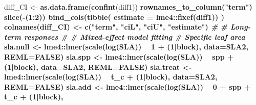 \documentclass[]{scrartcl}
\newenvironment{Shaded}{\begin{snugshade}}{\end{snugshade}}
\newcommand{\CommentTok}[1]{\textcolor[rgb]{0.56,0.35,0.01}{\textit{#1}}}
\newcommand{\DataTypeTok}[1]{\textcolor[rgb]{0.13,0.29,0.53}{#1}}
\newcommand{\DecValTok}[1]{\textcolor[rgb]{0.00,0.00,0.81}{#1}}
\newcommand{\KeywordTok}[1]{\textcolor[rgb]{0.13,0.29,0.53}{\textbf{#1}}}
\newcommand{\NormalTok}[1]{#1}
\newcommand{\OperatorTok}[1]{\textcolor[rgb]{0.81,0.36,0.00}{\textbf{#1}}}
\newcommand{\OtherTok}[1]{\textcolor[rgb]{0.56,0.35,0.01}{#1}}
\newcommand{\StringTok}[1]{\textcolor[rgb]{0.31,0.60,0.02}{#1}}
\begin{document}
\begin{Shaded}
\begin{Highlighting}[]
{{{{{{{{{\NormalTok{    diff_CI <-}\StringTok{ }\KeywordTok{as.data.frame}\NormalTok{(}\KeywordTok{confint}\NormalTok{(diff1)) }\OperatorTok{%
\StringTok{                }\KeywordTok{rownames_to_column}\NormalTok{(}\StringTok{"term"}\NormalTok{) }\OperatorTok{%
\StringTok{                }\KeywordTok{slice}\NormalTok{(}\OperatorTok{-}\NormalTok{(}\DecValTok{1}\OperatorTok{:}\DecValTok{2}\NormalTok{)) }\OperatorTok{%
\StringTok{                }\KeywordTok{bind_cols}\NormalTok{(}\KeywordTok{tibble}\NormalTok{(}
                  \DataTypeTok{estimate =}\NormalTok{ lme4}\OperatorTok{::}\KeywordTok{fixef}\NormalTok{(diff1)) )}
    \KeywordTok{colnames}\NormalTok{(diff_CI) <-}\StringTok{ }\KeywordTok{c}\NormalTok{(}\StringTok{"term"}\NormalTok{, }\StringTok{"ciL"}\NormalTok{, }\StringTok{"ciU"}\NormalTok{, }\StringTok{"estimate"}\NormalTok{)}
\CommentTok{#}
\CommentTok{#  Long-term responses}
\CommentTok{#}
\CommentTok{# Mixed-effect model fitting}
  \CommentTok{# Specific leaf area}
\NormalTok{    sla.null <-}\StringTok{ }\NormalTok{lme4}\OperatorTok{::}\KeywordTok{lmer}\NormalTok{(}\KeywordTok{scale}\NormalTok{(}\KeywordTok{log}\NormalTok{(SLA)) }\OperatorTok{~}\StringTok{ }\DecValTok{1} \OperatorTok{+}\StringTok{ }\NormalTok{(}\DecValTok{1}\OperatorTok{|}\NormalTok{block), }
                           \DataTypeTok{data=}\NormalTok{SLA2, }\DataTypeTok{REML=}\OtherTok{FALSE}\NormalTok{)}
\NormalTok{    sla.spp <-}\StringTok{ }\NormalTok{lme4}\OperatorTok{::}\KeywordTok{lmer}\NormalTok{(}\KeywordTok{scale}\NormalTok{(}\KeywordTok{log}\NormalTok{(SLA)) }\OperatorTok{~}\StringTok{ }\NormalTok{spp }\OperatorTok{+}\StringTok{ }\NormalTok{(}\DecValTok{1}\OperatorTok{|}\NormalTok{block), }
                          \DataTypeTok{data=}\NormalTok{SLA2, }\DataTypeTok{REML=}\OtherTok{FALSE}\NormalTok{)}
\NormalTok{    sla.treat <-}\StringTok{ }\NormalTok{lme4}\OperatorTok{::}\KeywordTok{lmer}\NormalTok{(}\KeywordTok{scale}\NormalTok{(}\KeywordTok{log}\NormalTok{(SLA)) }\OperatorTok{~}\StringTok{ }\NormalTok{t_c }\OperatorTok{+}\StringTok{ }\NormalTok{(}\DecValTok{1}\OperatorTok{|}\NormalTok{block), }
                            \DataTypeTok{data=}\NormalTok{SLA2, }\DataTypeTok{REML=}\OtherTok{FALSE}\NormalTok{)}
\NormalTok{    sla.add <-}\StringTok{ }\NormalTok{lme4}\OperatorTok{::}\KeywordTok{lmer}\NormalTok{(}\KeywordTok{scale}\NormalTok{(}\KeywordTok{log}\NormalTok{(SLA)) }\OperatorTok{~}\StringTok{ }\DecValTok{0} \OperatorTok{+}\StringTok{ }\NormalTok{spp }\OperatorTok{+}\StringTok{ }\NormalTok{t_c }\OperatorTok{+}\StringTok{ }\NormalTok{(}\DecValTok{1}\OperatorTok{|}\NormalTok{block), }
}}}}}}}}}}}}
\end{Highlighting}
\end{Shaded}
\end{document}
